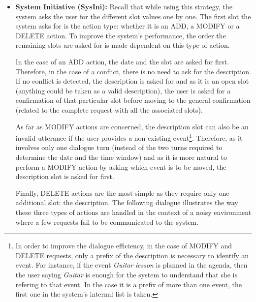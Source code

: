       \begin{itemize}
          \item \textbf{System Initiative (SysIni):} Recall that while using this strategy, the system asks the user for the different slot values one by one. The first slot the system asks for is the action type: whether it is an ADD, a MODIFY or a DELETE action. To improve the system's performance, the order the remaining slots are asked for is made dependent on this type of action.
					
						In the case of an ADD action, the date and the slot are asked for first. Therefore, in the case of a conflict, there is no need to ask for the description. If no conflict is detected, the description is asked for and as it is an open slot (anything could be taken as a valid description), the user is asked for a confirmation of that particular slot before moving to the general confirmation (related to the complete request with all the associated slots).
						
						As far as MODIFY actions are concerned, the description slot can also be an invalid utterance if the user provides a non existing event\footnote{In order to improve the dialogue efficiency, in the case of MODIFY and DELETE requests, only a prefix of the description is necessary to identify an event. For instance, if the event \textit{Guitar lesson} is planned in the agenda, then the user saying \textit{Guitar} is enough for the system to understand that she is refering to that event. In the case it is a prefix of more than one event, the first one in the system's internal list is taken.}. Therefore, as it involves only one dialogue turn (instead of the two turns required to determine the date and the time window) and as it is more natural to perform a MODIFY action by asking which event is to be moved, the description slot is asked for first.
						
						Finally, DELETE actions are the most simple as they require only one additional slot: the description. The following dialogue illustrates the way these three types of actions are handled in the context of a noisy environment where a few requests fail to be communicated to the system.
						

\end{itemize}
